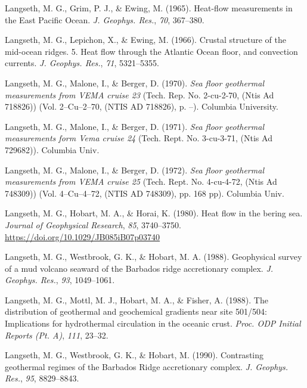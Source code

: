 \documentclass[draft,linenumbers]{agujournal2018}
\begin{document}
\leavevmode{}%
Langseth, M. G., Grim, P. J., \& Ewing, M. (1965). Heat-flow
measurements in the {East Pacific Ocean}. \emph{J. Geophys. Res.},
\emph{70}, 367--380.

\leavevmode{}%
Langseth, M. G., Lepichon, X., \& Ewing, M. (1966). Crustal structure of
the mid-ocean ridges. {5. Heat flow through the Atlantic Ocean floor,
and convection currents}. \emph{J. Geophys. Res.}, \emph{71},
5321--5355.

\leavevmode{}%
Langseth, M. G., Malone, I., \& Berger, D. (1970). \emph{Sea floor
geothermal measurements from VEMA cruise 23} (Tech. Rep. No. 2-cu-2-70,
(Ntis Ad 718826)) (Vol. 2--Cu--2--70, (NTIS AD 718826), p. --). Columbia
University.

\leavevmode{}%
Langseth, M. G., Malone, I., \& Berger, D. (1971). \emph{Sea floor
geothermal measurements form {Vema} cruise 24} (Tech. Rept. No.
3-cu-3-71, (Ntis Ad 729682)). Columbia Univ.

\leavevmode{}%
Langseth, M. G., Malone, I., \& Berger, D. (1972). \emph{Sea floor
geothermal measurements from VEMA cruise 25} (Tech. Rept. No. 4-cu-4-72,
(Ntis Ad 748309)) (Vol. 4--Cu--4--72, (NTIS AD 748309), pp. 168 pp).
Columbia Univ.

\leavevmode{}%
Langseth, M. G., Hobart, M. A., \& Horai, K. (1980). Heat flow in the
bering sea. \emph{Journal of Geophysical Research}, \emph{85},
3740--3750. \url{https://doi.org/10.1029/JB085iB07p03740}

\leavevmode{}%
Langseth, M. G., Westbrook, G. K., \& Hobart, M. A. (1988). Geophysical
survey of a mud volcano seaward of the {Barbados} ridge accretionary
complex. \emph{J. Geophys. Res.}, \emph{93}, 1049--1061.

\leavevmode{}%
Langseth, M. G., Mottl, M. J., Hobart, M. A., \& Fisher, A. (1988). The
distribution of geothermal and geochemical gradients near site 501/504:
Implications for hydrothermal circulation in the oceanic crust.
\emph{Proc. ODP Initial Reports (Pt. A)}, \emph{111}, 23--32.

\leavevmode{}%
Langseth, M. G., Westbrook, G. K., \& Hobart, M. (1990). Contrasting
geothermal regimes of the {Barbados Ridge} accretionary complex.
\emph{J. Geophys. Res.}, \emph{95}, 8829--8843.
\end{document}
